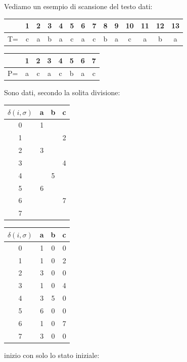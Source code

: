 \documentclass[a4paper,12pt, oneside]{book}
\begin{document}
\begin{esempio}
  Vediamo un esempio di scansione del testo dati:
  \begin{table}[H]
    \centering
    \begin{tabular}{c||c|c|c|c|c|c|c|c|c|c|c|c|c}
      \hline
      & 1 & 2 & 3 & 4 & 5 & 6 & 7 & 8 & 9 & 10 & 11 & 12 & 13 \\
      \hline
      T=&c& a & b& a& c& a &c &b &a &c&a&b&a\\
      \hline
    \end{tabular}
  \end{table}
  \begin{table}[H]
    \centering
    \begin{tabular}{c||c|c|c|c|c|c|c}
      \hline
      & 1 & 2 & 3 & 4 & 5 & 6 & 7 \\
      \hline
      P=&a& c & a& c& b& a &c \\
      \hline
    \end{tabular}
  \end{table}
  Sono dati, secondo la solita divisione:
  \begin{table}[H]
    \centering
    \begin{tabular}{c||c|c|c}
      $\delta(i,\sigma)$ & a & b & c\\
      \hline
      0 & 1 &  & \\
      1 &  &  & 2\\
      2 & 3 &  & \\
      3 &  &  & 4\\
      4 &  & 5 & \\
      5 & 6 &  & \\
      6 &  &  & 7\\
      7 &  &  & 
    \end{tabular}
  \end{table}
  \begin{table}[H]
    \centering
    \begin{tabular}{c||c|c|c}
      $\delta(i,\sigma)$ & a & b & c\\
      \hline
      0 & 1 & 0 & 0\\
      1 & 1 & 0 & 2\\
      2 & 3 & 0 & 0\\
      3 & 1 & 0 & 4\\
      4 & 3 & 5 & 0\\
      5 & 6 & 0 & 0\\
      6 & 1 & 0 & 7\\
      7 & 3 & 0 & 0
    \end{tabular}
  \end{table}
  inizio con solo lo stato iniziale:
  \begin{center}
\end{center}
\end{esempio}
\end{document}
